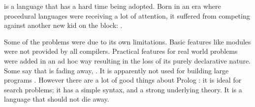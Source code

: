 \documentclass[thesis-solanki.tex]{subfiles}
\begin{document}

\begin{comment}
\progLang{Prolog} has a similar story. It was born in an era where procedural programming had made everyone notice their presence. Talking about
competition, it was against something radical; the \progLang{C} programming language. The languages \progLang{C} has influenced is off the chart and
so is the performance. It had paved the way for structured procedural programming and had given birth to the Unix operating system. Though the
original version of \progLang{Prolog} has given rise to a large number of different flavours but a few drawbacks remain through the bloodline and as a
result it did become the first choice. Some basic requirements such as modules are not provided by all compilers. To make it do real world stuff, a set of
practical features are pushed in now and then which results in the loss of the purely declarative charm. The problem is that \progLang{Prolog} is fading
away, \cite{website:prolog-steam,website:prolog-death,website:prolog-killer}, not many people use it and most of the times when it is used, the variant
is usually \textit{practical} \progLang{Prolog} and the area being academia. It is not used for building large programs \cite{wikiprolog,somogyi1995
logic,website:prolog1000db}. But there are a lot of good things about \progLang{Prolog} that should not die away. Moreover, \progLang{Prolog} is ideal
for search problems.
\end{comment}

 is a language that has a hard time being adopted.
Born in an era where procedural languages were receiving a lot of attention, it suffered from competing against
another new kid on the block: .

Some of the problems were due to its own limitations.
Basic features like modules were not provided by all compilers.
Practical features for real world problems were added in an ad hoc way resulting in the loss of its purely
declarative nature.
Some say that  is fading away,
\cite{website:prolog-steam,website:prolog-death,website:prolog-killer}.
It is apparently not used for building large programs \cite{wikiprolog,somogyi1995logic,website:prolog1000db}.
However there are a lot of good things about Prolog
: it is ideal for search problems; it has a simple syntax, and a
strong underlying theory.
It is a language that should not die away.
\end{document}
